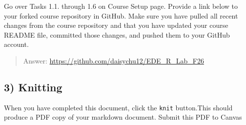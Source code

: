 \documentclass[
]{article}
\begin{document}
Go over Tasks 1.1. through 1.6 on Course Setup page. Provide a link
below to your forked course repository in GitHub. Make sure you have
pulled all recent changes from the course repository and that you have
updated your course README file, committed those changes, and pushed
them to your GitHub account.

\begin{quote}
Answer: \url{https://github.com/daisychu12/EDE_R_Lab_F26}
\end{quote}

\subsection{3) Knitting}\label{knitting}

When you have completed this document, click the \texttt{knit}
button.This should produce a PDF copy of your markdown document. Submit
this PDF to Canvas
\end{document}
